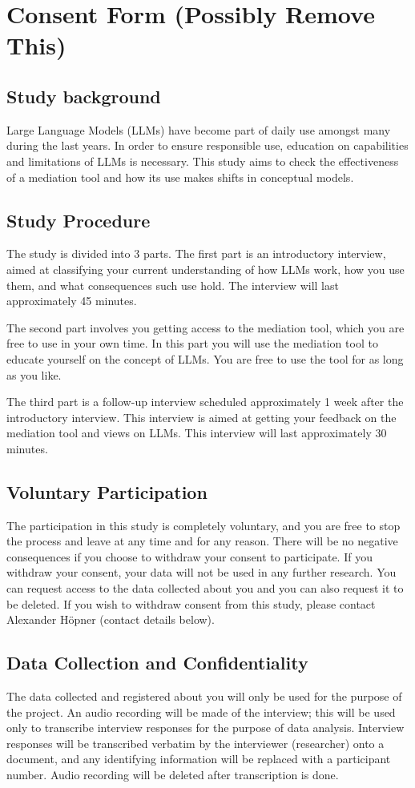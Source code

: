 \chapter{Consent Form (Possibly Remove This)}

\section*{Study background}
Large Language Models (LLMs) have become part of daily use amongst many during the last years. In order to ensure responsible use, education on capabilities and limitations of LLMs is necessary. This study aims to check the effectiveness of a mediation tool and how its use makes shifts in conceptual models.

\section*{Study Procedure}
The study is divided into 3 parts. The first part is an introductory interview, aimed at classifying your current understanding of how LLMs work, how you use them, and what consequences such use hold. The interview will last approximately 45 minutes.

The second part involves you getting access to the mediation tool, which you are free to use in your own time. In this part you will use the mediation tool to educate yourself on the concept of LLMs. You are free to use the tool for as long as you like.

The third part is a follow-up interview scheduled approximately 1 week after the introductory interview. This interview is aimed at getting your feedback on the mediation tool and views on LLMs. This interview will last approximately 30 minutes.

\section*{Voluntary Participation}
The participation in this study is completely voluntary, and you are free to stop the process and leave at any time and for any reason. There will be no negative consequences if you choose to withdraw your consent to participate. If you withdraw your consent, your data will not be used in any further research. You can request access to the data collected about you and you can also request it to be deleted. If you wish to withdraw consent from this study, please contact Alexander Höpner (contact details below).

\section*{Data Collection and Confidentiality}
The data collected and registered about you will only be used for the purpose of the project. An audio recording will be made of the interview; this will be used only to transcribe interview responses for the purpose of data analysis. Interview responses will be transcribed verbatim by the interviewer (researcher) onto a document, and any identifying information will be replaced with a participant number. Audio recording will be deleted after transcription is done.

